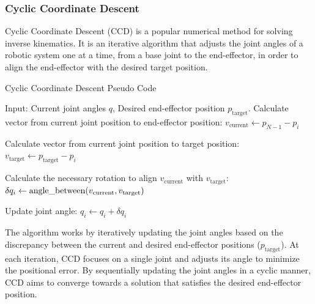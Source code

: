 \subsubsection{Cyclic Coordinate Descent}

Cyclic Coordinate Descent (CCD) is a popular numerical method for solving inverse kinematics. It is an iterative algorithm that adjusts the joint angles of a robotic system one at a time, from a base joint to the end-effector, in order to align the end-effector with the desired target position.

\begin{algorithm}
    \caption{Cyclic Coordinate Descent Pseudo Code}\label{alg:CCD}
    \begin{algorithmic}
        \State{} Input: Current joint angles $q$, Desired end-effector position $p_\text{target}$.
                \State{} Calculate vector from current joint position to end-effector position:
                \State{} $v_\text{current} \leftarrow p_{N-1} - p_i$

                \State{} Calculate vector from current joint position to target position:
                \State{} $v_\text{target} \leftarrow p_\text{target} - p_i$

                \State{} Calculate the necessary rotation to align $v_\text{current}$ with $v_\text{target}$:
                \State{} $\delta q_i \leftarrow \text{angle\textunderscore between}(v_\text{current}, v_\text{target})$

                \State{} Update joint angle:
                \State{} $q_i \leftarrow q_i + \delta q_i$
            \EndFor{}
        \EndWhile{}
\end{algorithmic}
\end{algorithm}

The algorithm works by iteratively updating the joint angles based on the discrepancy between the current and desired end-effector positions ($p_\text{target}$). At each iteration, CCD focuses on a single joint and adjusts its angle to minimize the positional error. By sequentially updating the joint angles in a cyclic manner, CCD aims to converge towards a solution that satisfies the desired end-effector position.

